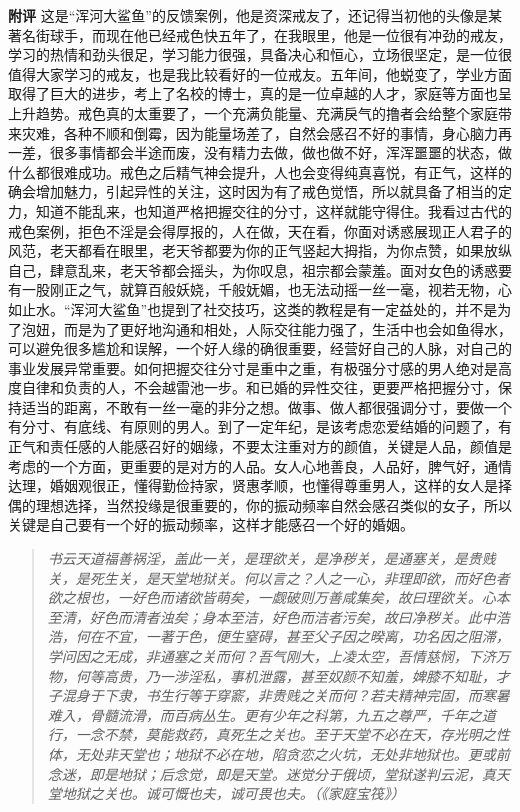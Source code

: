 \begin{case}
    \textbf{附评} 这是“浑河大鲨鱼”的反馈案例，他是资深戒友了，还记得当初他的头像是某著名街球手，而现在他已经戒色快五年了，在我眼里，他是一位很有冲劲的戒友，学习的热情和劲头很足，学习能力很强，具备决心和恒心，立场很坚定，是一位很值得大家学习的戒友，也是我比较看好的一位戒友。五年间，他蜕变了，学业方面取得了巨大的进步，考上了名校的博士，真的是一位卓越的人才，家庭等方面也呈上升趋势。戒色真的太重要了，一个充满负能量、充满戾气的撸者会给整个家庭带来灾难，各种不顺和倒霉，因为能量场差了，自然会感召不好的事情，身心脑力再一差，很多事情都会半途而废，没有精力去做，做也做不好，浑浑噩噩的状态，做什么都很难成功。戒色之后精气神会提升，人也会变得纯真喜悦，有正气，这样的确会增加魅力，引起异性的关注，这时因为有了戒色觉悟，所以就具备了相当的定力，知道不能乱来，也知道严格把握交往的分寸，这样就能守得住。我看过古代的戒色案例，拒色不淫是会得厚报的，人在做，天在看，你面对诱惑展现正人君子的风范，老天都看在眼里，老天爷都要为你的正气竖起大拇指，为你点赞，如果放纵自己，肆意乱来，老天爷都会摇头，为你叹息，祖宗都会蒙羞。面对女色的诱惑要有一股刚正之气，就算百般妖娆，千般妩媚，也无法动摇一丝一毫，视若无物，心如止水。“浑河大鲨鱼”也提到了社交技巧，这类的教程是有一定益处的，并不是为了泡妞，而是为了更好地沟通和相处，人际交往能力强了，生活中也会如鱼得水，可以避免很多尴尬和误解，一个好人缘的确很重要，经营好自己的人脉，对自己的事业发展异常重要。如何把握交往分寸是重中之重，有极强分寸感的男人绝对是高度自律和负责的人，不会越雷池一步。和已婚的异性交往，更要严格把握分寸，保持适当的距离，不敢有一丝一毫的非分之想。做事、做人都很强调分寸，要做一个有分寸、有底线、有原则的男人。到了一定年纪，是该考虑恋爱结婚的问题了，有正气和责任感的人能感召好的姻缘，不要太注重对方的颜值，关键是人品，颜值是考虑的一个方面，更重要的是对方的人品。女人心地善良，人品好，脾气好，通情达理，婚姻观很正，懂得勤俭持家，贤惠孝顺，也懂得尊重男人，这样的女人是择偶的理想选择，当然投缘是很重要的，你的振动频率自然会感召类似的女子，所以关键是自己要有一个好的振动频率，这样才能感召一个好的婚姻。

    \begin{quote}\it
        书云天道福善祸淫，盖此一关，是理欲关，是净秽关，是通塞关，是贵贱关，是死生关，是天堂地狱关。何以言之？人之一心，非理即欲，而好色者欲之根也，一好色而诸欲皆萌矣，一觑破则万善咸集矣，故曰理欲关。心本至清，好色而清者浊矣；身本至洁，好色而洁者污矣，故曰净秽关。此中浩浩，何在不宜，一著于色，便生窒碍，甚至父子因之暌离，功名因之阻滞，学问因之无成，非通塞之关而何？吾气刚大，上凌太空，吾情慈悯，下济万物，何等高贵，乃一涉淫私，事机泄露，甚至奴颜不知羞，婢膝不知耻，才子混身于下隶，书生行等于穿窬，非贵贱之关而何？若夫精神完固，而寒暑难入，骨髓流滑，而百病丛生。更有少年之科第，九五之尊严，千年之道行，一念不禁，莫能救药，真死生之关也。至于天堂不必在天，存光明之性体，无处非天堂也；地狱不必在地，陷贪恋之火坑，无处非地狱也。更或前念迷，即是地狱；后念觉，即是天堂。迷觉分于俄顷，堂狱遂判云泥，真天堂地狱之关也。诚可慨也夫，诚可畏也夫。（《家庭宝筏》）
    \end{quote}


\end{case}
